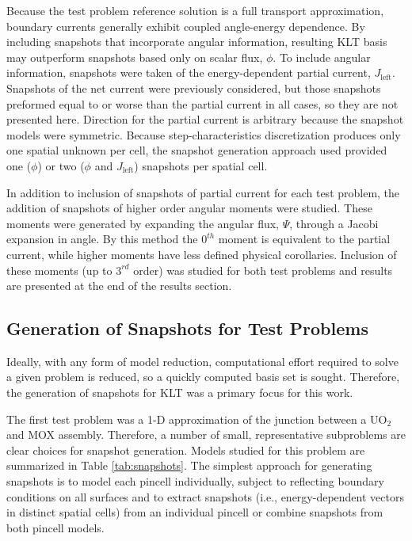 \documentclass[5p,times,twocolumn,10pt]{elsarticle}
\begin{document}
  Because the test problem reference solution is a full transport approximation, boundary currents generally
  exhibit coupled angle-energy dependence.  By including snapshots that incorporate angular information,
  resulting KLT basis may outperform snapshots based only on scalar flux, $\phi$.  To include angular information, 
  snapshots were taken of the energy-dependent partial current, $J_{\text{left}}$.  Snapshots of the net
  current were previously considered, but those snapshots preformed equal to or worse than the 
  partial current in all cases, so they are not presented here.  Direction for the partial current is arbitrary
  because the snapshot models were symmetric. Because step-characteristics discretization produces only one
  spatial unknown per cell, the snapshot generation approach used provided one ($\phi$) or two 
  ($\phi$ and $J_{\text{left}}$) snapshots per spatial cell.
  
  In addition to inclusion of snapshots of partial current for each test problem, the addition of snapshots of higher
  order angular moments were studied.  These moments were generated by expanding the angular flux, $\Psi$,  
  through a Jacobi expansion in angle.  By this method the $0^{th}$ moment is equivalent to the partial current,
  while higher moments have less defined physical corollaries.  Inclusion of these moments (up to $3^{rd}$ order)
  was studied for both test problems and results are presented at the end of the results section.
  
  \subsection{Generation of Snapshots for Test Problems}
  
  Ideally, with any form of model reduction, computational effort required to solve a given problem is reduced, so a 
  quickly computed basis set is sought. Therefore, the generation of snapshots for KLT was a primary focus for 
  this work.  
  
  The first test problem was a 1-D approximation of the junction between a UO$_2$ and MOX assembly.  
  Therefore, a number of small, representative subproblems are clear choices for snapshot generation.  
  Models studied for this problem are summarized in Table \ref{tab:snapshots}.
  The simplest approach for generating snapshots is to model each pincell individually, subject to 
  reflecting boundary conditions on all surfaces and to extract snapshots (i.e., energy-dependent vectors
  in distinct spatial cells) from an individual pincell or combine snapshots from both pincell models.  
  
\end{document}
